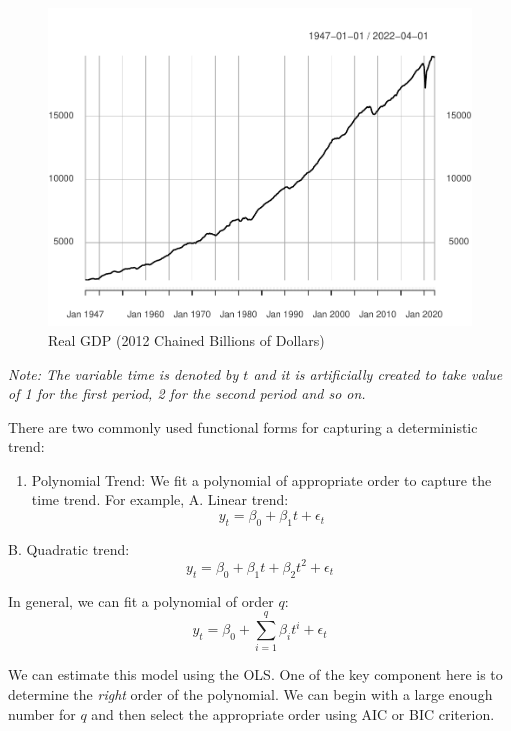 \documentclass[]{book}
\providecommand{\tightlist}{%
  \setlength{\itemsep}{0pt}\setlength{\parskip}{0pt}}
\theoremstyle{definition}
\theoremstyle{definition}
\theoremstyle{definition}
\theoremstyle{remark}
\begin{document}
\begin{figure}

{\centering \includegraphics[width=0.8\linewidth]{bookdown-demo_files/figure-latex/ch5-figure1-1} 

}

\caption{Real GDP (2012 Chained Billions of Dollars)}\label{fig:ch5-figure1}
\end{figure}

\emph{Note: The variable time is denoted by \(t\) and it is artificially created to take value of 1 for the first period, 2 for the second period and so on.}

There are two commonly used functional forms for capturing a deterministic trend:

\begin{enumerate}
\def\labelenumi{\arabic{enumi}.}
\tightlist
\item
  Polynomial Trend: We fit a polynomial of appropriate order to capture the time trend. For example,
  A. Linear trend:
  \begin{equation}
  y_t=\beta_0 +\beta_1 t +\epsilon_t
  \end{equation}
\end{enumerate}

B. Quadratic trend:
\begin{equation}
y_t=\beta_0 +\beta_1 t + \beta_2 t^2 +\epsilon_t
\end{equation}

In general, we can fit a polynomial of order \(q\):
\begin{equation}
y_t=\beta_0 + \sum_{i=1}^q \beta_i t^i +\epsilon_t
\end{equation}

We can estimate this model using the OLS. One of the key component here is to determine the \emph{right} order of the polynomial. We can begin with a large enough number for \(q\) and then select the appropriate order using AIC or BIC criterion.
\end{document}
